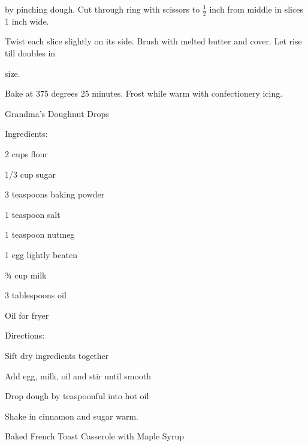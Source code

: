 \documentclass[a4paper,portrait,12pt]{book}
\begin{document}
by pinching dough. Cut through ring with scissors to $\frac{1}{2}$ inch from middle in slices 1 inch wide.




Twist each slice slightly on its side. Brush with melted butter and cover. Let rise till doubles in




size.




Bake at 375 degrees 25 minutes. Frost while warm with confectionery icing.







\newpage
Grandma's Doughnut Drops




Ingredients:




2 cups flour




1/3 cup sugar




3 teaspoons baking powder




1 teaspoon salt




1 teaspoon nutmeg




1 egg lightly beaten




¾ cup milk




3 tablespoons oil




Oil for fryer




Directions:




Sift dry ingredients together




Add egg, milk, oil and stir until smooth




Drop dough by teaspoonful into hot oil




Shake in cinnamon and sugar warm.







\newpage
Baked French Toast Casserole with Maple Syrup
\end{document}
